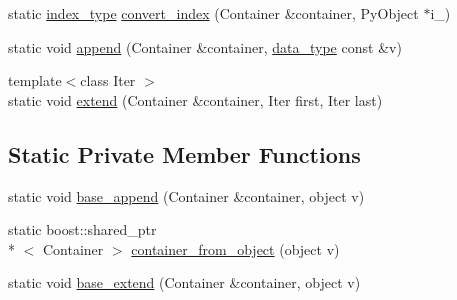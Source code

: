 \begin{DoxyCompactItemize}
\item 
static \hyperlink{classboost_1_1python_1_1std__vector__indexing__suite_a3124827b535a08798fbd33b9fee7b668}{index\-\_\-type} \hyperlink{classboost_1_1python_1_1std__vector__indexing__suite_ae4228941b0d743b8cfd1362fe95a1795}{convert\-\_\-index} (Container \&container, Py\-Object $\ast$i\-\_\-)
\item 
static void \hyperlink{classboost_1_1python_1_1std__vector__indexing__suite_a317a62cce09e40822e7c376cd6afc7b4}{append} (Container \&container, \hyperlink{classboost_1_1python_1_1std__vector__indexing__suite_a9c3db9df25d6966c54154275377c94ce}{data\-\_\-type} const \&v)
\item 
{\footnotesize template$<$class Iter $>$ }\\static void \hyperlink{classboost_1_1python_1_1std__vector__indexing__suite_a1e7c971129b8f99b579fbe311ce378d6}{extend} (Container \&container, Iter first, Iter last)
\end{DoxyCompactItemize}
\subsection*{Static Private Member Functions}
\begin{DoxyCompactItemize}
\item 
static void \hyperlink{classboost_1_1python_1_1std__vector__indexing__suite_a0857a3ee7c2b30c2d4b3452c8d16665e}{base\-\_\-append} (Container \&container, object v)
\item 
static boost\-::shared\-\_\-ptr\\*
$<$ Container $>$ \hyperlink{classboost_1_1python_1_1std__vector__indexing__suite_a1860d96ad96a74166d03d433826a5249}{container\-\_\-from\-\_\-object} (object v)
\item 
static void \hyperlink{classboost_1_1python_1_1std__vector__indexing__suite_acac3b93b150b5101da9b16e961ea4f09}{base\-\_\-extend} (Container \&container, object v)
\end{DoxyCompactItemize}



